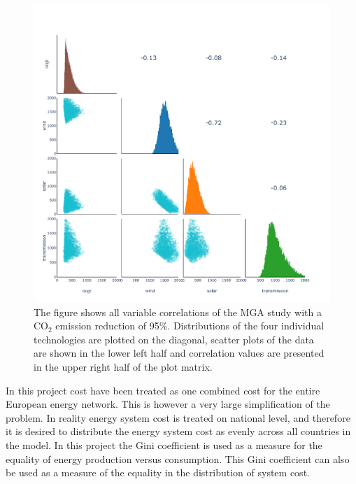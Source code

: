 \begin{figure}[h]\center
	\includegraphics[width=1.\textwidth,trim={0 0cm 0 0cm},clip]{./Images/corelation_4D_95}
	\caption{The figure shows all variable correlations of the MGA study with a $\text{CO}_2$ emission reduction of 95\%. Distributions of the four individual technologies are plotted on the diagonal, scatter plots of the data are shown in the lower left half and correlation values are presented in the upper right half of the plot matrix.}
	\label{fig:corelation_2}
\end{figure}

In this project cost have been treated as one combined cost for the entire European energy network. This is however a very large simplification of the problem. In reality energy system cost is treated on national level, and therefore it is desired to distribute the energy system cost as evenly across all countries in the model. In this project the Gini coefficient is used as a measure for the equality of energy production versus consumption. This Gini coefficient can also be used as a measure of the equality in the distribution of system cost. 


